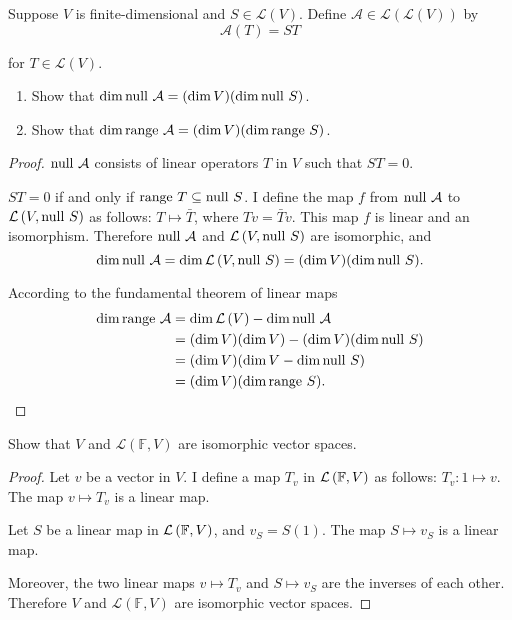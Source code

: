 \begin{exercise}
    Suppose $V$ is finite-dimensional and $S\in\mathcal{L}(V)$. Define $\mathcal{A}\in \mathcal{L}(\mathcal{L}(V))$ by
    \[
        \mathcal{A}(T) = ST
    \]

    for $T\in\mathcal{L}(V)$.

    \begin{enumerate}[label={(\alph*)}]
        \item Show that $\dim\operatorname{null}\,{\mathcal{A}} = (\dim V)(\dim\operatorname{null}\,{S})$.
        \item Show that $\dim\operatorname{range}\,{\mathcal{A}} = (\dim V)(\dim\operatorname{range}\,{S})$.
    \end{enumerate}
\end{exercise}

\begin{proof}
    $\operatorname{null}\,{\mathcal{A}}$ consists of linear operators $T$ in $V$ such that $ST = 0$.

    $ST = 0$ if and only if $\operatorname{range}\,{T} \subseteq \operatorname{null}\,{S}$. I define the map $f$ from $\operatorname{null}\,{\mathcal{A}}$ to $\mathcal{L}\left({V, \operatorname{null}\,{S}}\right)$ as follows: $T\mapsto \bar{T}$, where $Tv = \bar{T}v$. This map $f$ is linear and an isomorphism. Therefore $\operatorname{null}\,{\mathcal{A}}$ and $\mathcal{L}\left({V, \operatorname{null}\,{S}}\right)$ are isomorphic, and
    \[
        \dim\operatorname{null}\,{\mathcal{A}} = \dim \mathcal{L}\left({V, \operatorname{null}\,{S}}\right) = (\dim V)(\dim\operatorname{null}\,{S}).
    \]

    According to the fundamental theorem of linear maps
    \begin{align*}
        \dim\operatorname{range}\,{\mathcal{A}} & = \dim\mathcal{L}\left({V}\right) - \dim\operatorname{null}\,{\mathcal{A}}      \\
                                & = (\dim V)(\dim V) - (\dim V)(\dim \operatorname{null}\,{S}) \\
                                & = (\dim V)(\dim V - \dim\operatorname{null}\,{S})            \\
                                & = (\dim V)(\dim\operatorname{range}\,{S}).\qedhere
    \end{align*}
\end{proof}
\newpage

\begin{exercise}
    Show that $V$ and $\mathcal{L}(\mathbb{F}, V)$ are isomorphic vector spaces.
\end{exercise}

\begin{proof}
    Let $v$ be a vector in $V$. I define a map $T_{v}$ in $\mathcal{L}\left({\mathbb{F}, V}\right)$ as follows: $T_{v}: 1\mapsto v$. The map $v\mapsto T_{v}$ is a linear map.

    Let $S$ be a linear map in $\mathcal{L}\left({\mathbb{F}, V}\right)$, and $v_{S} = S(1)$. The map $S\mapsto v_{S}$ is a linear map.

    Moreover, the two linear maps $v\mapsto T_{v}$ and $S\mapsto v_{S}$ are the inverses of each other. Therefore $V$ and $\mathcal{L}(\mathbb{F}, V)$ are isomorphic vector spaces.
\end{proof}
\newpage

